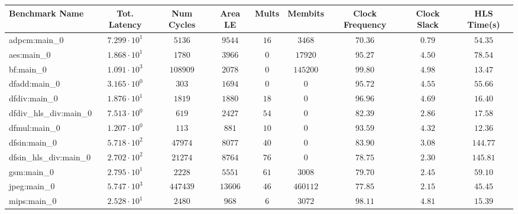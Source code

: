 \begin{tabular}{|l|c|c|c|c|c|c|c|c|}
\hline
Benchmark Name          & Tot. Latency           & Num Cycles & Area LE   & Mults   & Membits    & Clock Frequency & Clock Slack & HLS Time(s) \\
\hline
adpcm:main\_0           & $ 7.299 \cdot 10^{1} $ & $ 5136   $ & $ 9544  $ & $ 16  $ & $ 3468   $ & $ 70.36       $ & $ 0.79    $ & $ 54.35   $ \\
aes:main\_0             & $ 1.868 \cdot 10^{1} $ & $ 1780   $ & $ 3966  $ & $ 0   $ & $ 17920  $ & $ 95.27       $ & $ 4.50    $ & $ 78.54   $ \\
bf:main\_0              & $ 1.091 \cdot 10^{3} $ & $ 108909 $ & $ 2078  $ & $ 0   $ & $ 145200 $ & $ 99.80       $ & $ 4.98    $ & $ 13.47   $ \\
dfadd:main\_0           & $ 3.165 \cdot 10^{0} $ & $ 303    $ & $ 1694  $ & $ 0   $ & $ 0      $ & $ 95.72       $ & $ 4.55    $ & $ 55.66   $ \\
dfdiv:main\_0           & $ 1.876 \cdot 10^{1} $ & $ 1819   $ & $ 1880  $ & $ 18  $ & $ 0      $ & $ 96.96       $ & $ 4.69    $ & $ 16.40   $ \\
dfdiv\_hls\_div:main\_0 & $ 7.513 \cdot 10^{0} $ & $ 619    $ & $ 2427  $ & $ 54  $ & $ 0      $ & $ 82.39       $ & $ 2.86    $ & $ 17.58   $ \\
dfmul:main\_0           & $ 1.207 \cdot 10^{0} $ & $ 113    $ & $ 881   $ & $ 10  $ & $ 0      $ & $ 93.59       $ & $ 4.32    $ & $ 12.36   $ \\
dfsin:main\_0           & $ 5.718 \cdot 10^{2} $ & $ 47974  $ & $ 8077  $ & $ 40  $ & $ 0      $ & $ 83.90       $ & $ 3.08    $ & $ 144.77  $ \\
dfsin\_hls\_div:main\_0 & $ 2.702 \cdot 10^{2} $ & $ 21274  $ & $ 8764  $ & $ 76  $ & $ 0      $ & $ 78.75       $ & $ 2.30    $ & $ 145.81  $ \\
gsm:main\_0             & $ 2.795 \cdot 10^{1} $ & $ 2228   $ & $ 5551  $ & $ 61  $ & $ 3008   $ & $ 79.70       $ & $ 2.45    $ & $ 59.10   $ \\
jpeg:main\_0            & $ 5.747 \cdot 10^{3} $ & $ 447439 $ & $ 13606 $ & $ 46  $ & $ 460112 $ & $ 77.85       $ & $ 2.15    $ & $ 45.45   $ \\
mips:main\_0            & $ 2.528 \cdot 10^{1} $ & $ 2480   $ & $ 968   $ & $ 6   $ & $ 3072   $ & $ 98.11       $ & $ 4.81    $ & $ 15.39   $ \\

\end{tabular}
